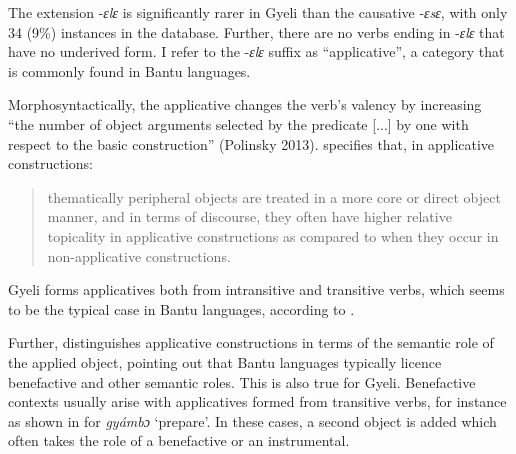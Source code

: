 The extension -{\itshape ɛlɛ}  is significantly rarer in Gyeli than the causative -{\itshape ɛsɛ}, with only 34 (9\%) instances in the database. Further, there are no verbs ending in -{\itshape ɛlɛ} that have no underived form. I refer to the -{\itshape ɛlɛ} suffix as ``applicative'', a category that is commonly found in Bantu languages.

Morphosyntactically, the applicative changes the verb's valency by increasing ``the number of object arguments selected by the predicate [...] by one with respect to the basic construction'' (Polinsky 2013). \citet[278]{peterson97} specifies that, in applicative constructions:
\begin{quote} thematically peripheral objects are treated in a more core or direct object manner, and in terms of discourse, they often have higher relative topicality in applicative constructions as compared to when they occur in non-applicative constructions. \end{quote}

\noindent Gyeli forms applicatives both from intransitive  and transitive  verbs, which seems to be the typical case in Bantu languages, according to \citet{polinsky2013}.


\noindent Further, \citet{polinsky2013} distinguishes applicative constructions in terms of the semantic role of the applied object, pointing out that Bantu languages typically licence benefactive and other semantic roles. This is also true for Gyeli. Benefactive contexts usually arise with applicatives formed from transitive verbs, for instance as shown in  for {\itshape gyámbɔ} `prepare'. In these cases, a second object is added which often takes the role of a benefactive or an instrumental.

